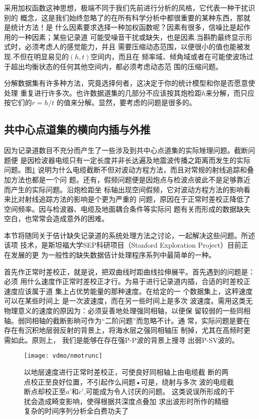 采用加权函数这神思想，极端不同于我们先前进行分析的风格，它代表一种干扰识别的
概念，这是我们始终忽略了的在所有科学分析中都很重要的某种东西，那就是统计方法！是
什么因素要求选择一种加权函数呢？因素有很多，信噪比是起作用的一种因素；某些记录道
可能受噪音干扰或缺失，也是因素.当斟酌最终显示形式时，必须考虑人的感觉能力，并且
需要压缩动态范围，以便很小的值也能被发现.不但在明显易见的$(h,t)$空间内，而且在
频率域、倾角域或者在可能使波场过于超出均衡状态的任何其他空间内，都必须考虑动态范
围的压缩问题。

分解数据集有许多种方法，究竟选择何者，这决定于你的统计模型和你是否愿意使处理
重复进行许多次。也许数据道集的几部分不应该按其炮检距$h$来分解，而只应按它们的$r=h/t$
的值来分解。显然，要考虑的问题是很多的。

\subsection{共中心点道集的横向内插与外推}
\label{sec:3.5.6}

因为记录道数目不充分而产生了一些涉及到共中心点道集的实际矬理问题。截断问题便
是因检波器电缆只有一定长度并非长达遍及地震波传播之距离而发生的实际问题。图\ref{fig:vdmo/nmotrunc}
说明为什么电缆截断不但对波动方程方法，而且对常规的射线追踪和叠加方法也都是一个问
题。还有，假频问题便是因炮点与检波点彼此不是足够靠近而产生的实际问题。沿炮检距坐
标轴出现空间假频，它对波动方程方法的影响看来比对射线追踪方法的影响是个更为严重的
问题，原因在于正常时差校正降低了空间频率。因与检波器、电缆及地面耦合条件等实际问
题有关而形成的数据缺失空白，也常常会造成意外的困难。

本节将随同关于佶计缺失记录道的系统处理方法之讨论，一起解决这些问题。所述该项
技术，是斯坦福大学SEP科研项目（Stanford Exploration
Project）目前正在发展的更
为一般性的缺失数据佶计处理程序系列中最简单的一种。

首先作正常时差校正，就是说，把双曲线时距曲线拉伸展平。首先遇到的问题是：必须
用什么速度作正常时差校正才行。为易于进行记录道内插，合适的时差校正速度应该属于道
集上占优势能量的那种速度。在给定的一 个数据集上，这秤速度可以在某些时间上
是一次波速度，而在另一些时间上是多次
波速度。需用这类无物理意义的速度的原因为：必须妥善地处理强同相轴，以便保
留较弱的一些同相轴。弱同相轴的截断影晌可作为“二阶问题”而忽略不计。通
常，实际问题是要在存在有沉积地层弱反射的背景上，将海水层之强同相轴压
制掉，尤其在高频时更需如此。原则上，
我们是能够在存在强P-P波的背景上搜寻
出弱P-SV波的。

\begin{figure}[H]
\centering
\texttt{[image: vdmo/nmotrunc]}
\caption[nmotrunc]{以地层速度进行正常时差校正，可使良好同相轴上由电缆截
断的两点校正至良好位置，不引起作么间题•可是，绕射与多次
波的电缆截断点却校正至$a'$和$c'$,可能成为令人讨厌的问题。
这类说误所形成的干扰会造成畸变影响，使得根据共深度点叠加
求出波形时所作的精细复杂的时间序列分析全白费功夫了}
\label{fig:vdmo/nmotrunc}
\end{figure}

